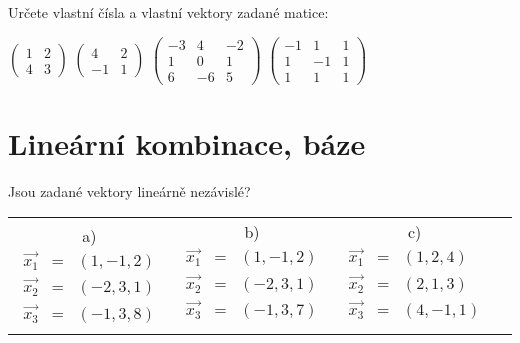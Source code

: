 \documentclass[a4paper,10pt]{book}
\newenvironment{tabbedenum}[1]
 {\NumTabs{#1}\inparaenum\let\latexitem\item
  \def\item{\def\item{\tab\latexitem}\latexitem}}
{\endinparaenum}
\begin{document}
\exercise \label{ex:mvlc2} Určete vlastní čísla a vlastní vektory zadané matice: 

\begin{tabbedenum}{3}
\item $\begin{pmatrix} 1 & 2 \\ 4 & 3 \end{pmatrix}$
\item $\begin{pmatrix} 4 & 2 \\ -1 & 1 \end{pmatrix}$
\item $\begin{pmatrix} -3 & 4 & -2 \\ 1 & 0 & 1 \\ 6 & -6 & 5 \end{pmatrix}$
\item $\begin{pmatrix} -1 & 1 & 1 \\ 1 & -1 & 1 \\ 1 & 1 & 1 \end{pmatrix}$
\end{tabbedenum}

\section{Lineární kombinace, báze}

\exercise \label{ex:lkb1} Jsou zadané vektory lineárně nezávislé?

\begin{center}
\begin{tabular}{cccc}
a)  $ \begin{array}{rcl}
        \vec{x_1} &=& (1, -1, 2) \\
        \vec{x_2} &=& (-2, 3, 1) \\
        \vec{x_3} &=& (-1, 3, 8) 
      \end{array}
  $ &
b)  $ \begin{array}{rcl}
        \vec{x_1} &=& (1, -1, 2) \\
        \vec{x_2} &=& (-2, 3, 1) \\
        \vec{x_3} &=& (-1, 3, 7) \\
      \end{array}
  $ &  
c)  $ \begin{array}{rcl}
        \vec{x_1} &=& (1, 2, 4) \\
        \vec{x_2} &=& (2, 1, 3) \\
        \vec{x_3} &=& (4, -1, 1) \\
      \end{array}
  $ 
\end{tabular}
\end{center}
\end{document}
